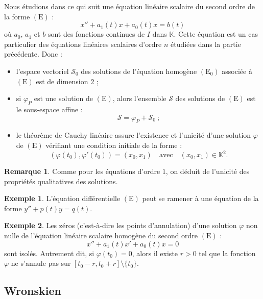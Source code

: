 \documentclass[french]{article}
\newcommand{\K}{\mathbb{K}}
\theoremstyle{plain}
\theoremstyle{definition}
\newtheorem*{ex}{Exemple}
\newtheorem*{rmq}{Remarque}
\theoremstyle{remark}
\begin{document}
Nous étudions dans ce qui suit une équation linéaire scalaire du second ordre de la forme $(\text{E})$ :
$$x''+a_1(t)x+a_0(t)x=b(t)$$
où $a_0$, $a_1$ et $b$ sont des fonctions continues de $I$ dans $\K$. Cette équation est un cas particulier des équations linéaires scalaires d'ordre $n$ étudiées dans la partie précédente. Donc :
\begin{itemize}
	\item l'espace vectoriel $\mathcal{S}_0$ des solutions de l'équation homogène $(\text{E}_0)$ associée à $(\text{E})$ est de dimension $2$ ;
	\item si $\varphi_P$ est une solution de $(\text{E})$, alors l'ensemble $\mathcal{S}$ des solutions de $(\text{E})$ est le sous-espace affine :
	$$\mathcal{S}=\varphi_P+\mathcal{S}_0\ ;$$
	\item le théorème de Cauchy linéaire assure l'existence et l'unicité d'une solution $\varphi$ de $(\text{E})$ vérifiant une condition initiale de la forme :
	$$(\varphi(t_0),\varphi'(t_0))=(x_0,x_1)\quad\text{avec}\quad(x_0,x_1)\in\K^2.$$
\end{itemize}

\begin{rmq}
	Comme pour les équations d'ordre $1$, on déduit de l'unicité des propriétés qualitatives des solutions.
\end{rmq}

\begin{ex}
	L'équation différentielle $(\text{E})$ peut se ramener à une équation de la forme $y''+p(t)y=q(t)$.
\end{ex}

\begin{ex}
	Les zéros (c'est-à-dire les points d'annulation) d'une solution $\varphi$ non nulle de l'équation linéaire scalaire homogène du second ordre $(\text{E})$ :
	$$x''+a_1(t)x'+a_0(t)x=0$$ sont isolés. Autrement dit, si $\varphi(t_0)=0$, alors il existe $r>0$ tel que la fonction $\varphi$ ne s'annule pas sur $[t_0-r,t_0+r]\setminus\{t_0\}$.
\end{ex}

\subsection{Wronskien}
\end{document}
